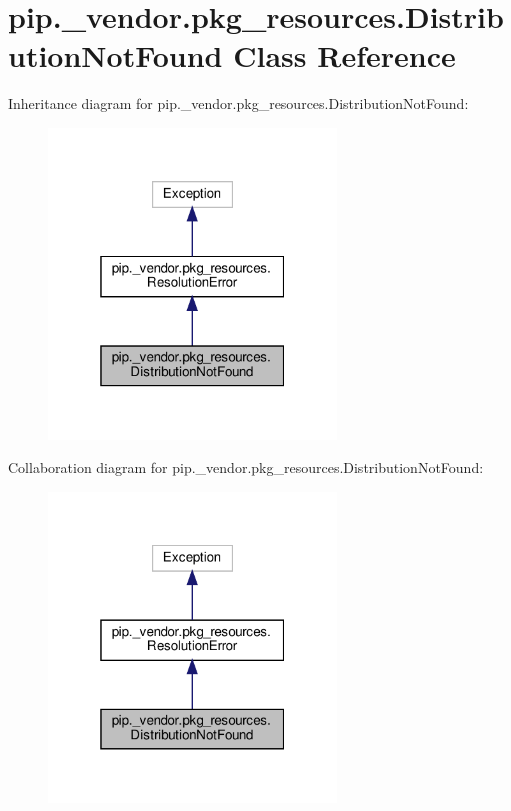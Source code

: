 \hypertarget{classpip_1_1__vendor_1_1pkg__resources_1_1DistributionNotFound}{}\section{pip.\+\_\+vendor.\+pkg\+\_\+resources.\+Distribution\+Not\+Found Class Reference}
\label{classpip_1_1__vendor_1_1pkg__resources_1_1DistributionNotFound}


Inheritance diagram for pip.\+\_\+vendor.\+pkg\+\_\+resources.\+Distribution\+Not\+Found\+:
\nopagebreak
\begin{figure}[H]
\begin{center}
\leavevmode
\includegraphics[width=217pt]{classpip_1_1__vendor_1_1pkg__resources_1_1DistributionNotFound__inherit__graph}
\end{center}
\end{figure}


Collaboration diagram for pip.\+\_\+vendor.\+pkg\+\_\+resources.\+Distribution\+Not\+Found\+:
\nopagebreak
\begin{figure}[H]
\begin{center}
\leavevmode
\includegraphics[width=217pt]{classpip_1_1__vendor_1_1pkg__resources_1_1DistributionNotFound__coll__graph}
\end{center}
\end{figure}
